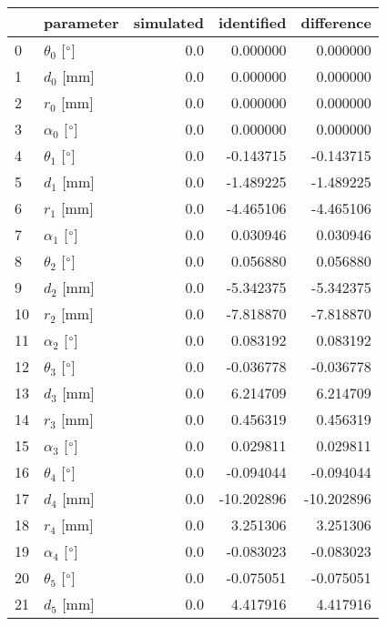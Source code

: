 \documentclass{standalone}%
\begin{document}
%
\normalsize%
\begin{tabular}{llrrr}
\toprule
{} &                 parameter & simulated & identified & difference \\
\midrule
0  &  $\theta_{0}$ [$\degree$] &       0.0 &   0.000000 &   0.000000 \\
1  &              $d_{0}$ [mm] &       0.0 &   0.000000 &   0.000000 \\
2  &              $r_{0}$ [mm] &       0.0 &   0.000000 &   0.000000 \\
3  &  $\alpha_{0}$ [$\degree$] &       0.0 &   0.000000 &   0.000000 \\
4  &  $\theta_{1}$ [$\degree$] &       0.0 &  -0.143715 &  -0.143715 \\
5  &              $d_{1}$ [mm] &       0.0 &  -1.489225 &  -1.489225 \\
6  &              $r_{1}$ [mm] &       0.0 &  -4.465106 &  -4.465106 \\
7  &  $\alpha_{1}$ [$\degree$] &       0.0 &   0.030946 &   0.030946 \\
8  &  $\theta_{2}$ [$\degree$] &       0.0 &   0.056880 &   0.056880 \\
9  &              $d_{2}$ [mm] &       0.0 &  -5.342375 &  -5.342375 \\
10 &              $r_{2}$ [mm] &       0.0 &  -7.818870 &  -7.818870 \\
11 &  $\alpha_{2}$ [$\degree$] &       0.0 &   0.083192 &   0.083192 \\
12 &  $\theta_{3}$ [$\degree$] &       0.0 &  -0.036778 &  -0.036778 \\
13 &              $d_{3}$ [mm] &       0.0 &   6.214709 &   6.214709 \\
14 &              $r_{3}$ [mm] &       0.0 &   0.456319 &   0.456319 \\
15 &  $\alpha_{3}$ [$\degree$] &       0.0 &   0.029811 &   0.029811 \\
16 &  $\theta_{4}$ [$\degree$] &       0.0 &  -0.094044 &  -0.094044 \\
17 &              $d_{4}$ [mm] &       0.0 & -10.202896 & -10.202896 \\
18 &              $r_{4}$ [mm] &       0.0 &   3.251306 &   3.251306 \\
19 &  $\alpha_{4}$ [$\degree$] &       0.0 &  -0.083023 &  -0.083023 \\
20 &  $\theta_{5}$ [$\degree$] &       0.0 &  -0.075051 &  -0.075051 \\
21 &              $d_{5}$ [mm] &       0.0 &   4.417916 &   4.417916 \\

\end{tabular}
\end{document}
